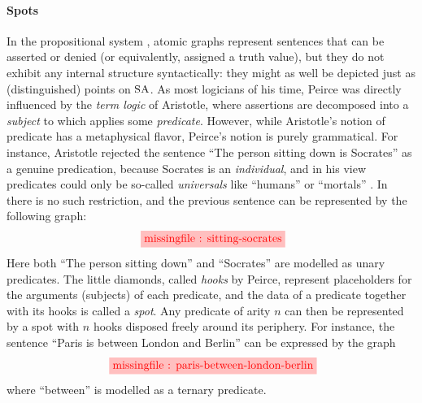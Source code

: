 \paragraph{Spots} In the propositional system , atomic graphs
represent sentences that can be asserted or denied (or equivalently, assigned a
truth value), but they do not exhibit any internal structure syntactically: they
might as well be depicted just as (distinguished) points on $\small\textsc{SA}$. As most
logicians of his time, Peirce was directly influenced by the \emph{term logic}
of Aristotle, where assertions are decomposed into a \emph{subject} to which
applies some \emph{predicate}. However, while Aristotle's notion of predicate
has a metaphysical flavor, Peirce's notion is purely grammatical. For instance,
Aristotle rejected the sentence ``The person sitting down is Socrates'' as a
genuine predication, because Socrates is an \emph{individual}, and in his view
predicates could only be so-called \emph{universals} like ``humans'' or
``mortals'' . In  there is no such
restriction, and the previous sentence can be represented by the following
graph:
\begin{equation}
  \tikzfig{1}{0.5}{sitting-socrates} \label{eq:sitting-socrates}
\end{equation}
Here both ``The person sitting down'' and ``Socrates'' are modelled as unary
predicates. The little diamonds, called \emph{hooks} by Peirce, represent
placeholders for the arguments (subjects) of each predicate, and the data of a
predicate together with its hooks is called a \emph{spot}. Any predicate of arity $n$ can then be represented by a spot with
$n$ hooks disposed freely around its periphery. For instance, the sentence
``Paris is between London and Berlin'' can be expressed by the graph
\begin{equation*}
  \tikzfig{1}{0.5}{paris-between-london-berlin} \label{eq:paris-between-london-berlin}
\end{equation*}
where ``between'' is modelled as a ternary predicate.

